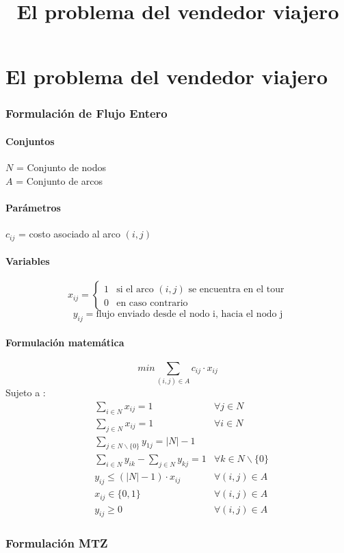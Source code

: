 \documentclass{article}
\title{El problema del vendedor viajero}
\begin{document}
\part{El problema del vendedor viajero}
\section{Formulación de Flujo Entero}
\subsection{Conjuntos}
$N$ = Conjunto de nodos\\
$A$ = Conjunto de arcos
\subsection{Parámetros}
$c_{ij}$ = costo asociado al arco $(i,j)$
\subsection{Variables}
\begin{flushleft}
\[x_{ij}={\begin{cases}1&{\mbox{si el arco $(i,j)$ se encuentra en el tour}}\\0&{\mbox{en caso contrario}}\end{cases}}
\]
\[y_{ij} = \mbox{flujo enviado desde el nodo i, hacia el nodo j}\]
\end{flushleft}
\subsection{Formulación matemática}
\begin{equation}
min \sum_{(i,j) \in A} c_{ij} \cdot x_{ij}
\end{equation}
Sujeto a : \begin{align}
& \sum_{i \in N} x_{ij} = 1 &\forall j \in N \\
& \sum_{j \in N} x_{ij} = 1 &\forall i \in N \\
& \sum_{j \in N \backslash \{0\}} y_{1j} = |N| - 1 \\
& \sum_{i \in N} y_{ik} - \sum_{j \in N} y_{kj} = 1&\forall k \in N \backslash \{0\} \\
& y_{ij} \leq (|N| - 1) \cdot  x_{ij} & \forall (i,j) \in A\\
& x_{ij} \in \{0,1\} &\forall (i,j) \in A\\
& y_{ij} \geq 0 &\forall (i,j) \in A
\end{align}
\section{Formulación MTZ}
\end{document}
